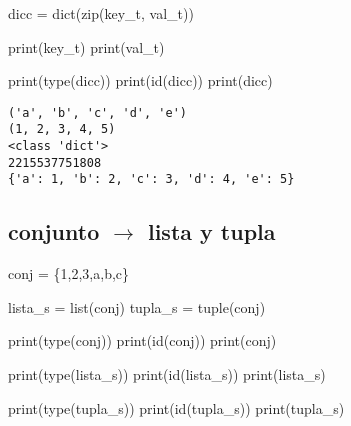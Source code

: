 \documentclass[
  letterpaper,
  DIV=11,
  numbers=noendperiod]{scrreprt}
\newenvironment{Shaded}{\begin{snugshade}}{\end{snugshade}}
\newcommand{\BuiltInTok}[1]{\textcolor[rgb]{0.00,0.23,0.31}{#1}}
\newcommand{\DecValTok}[1]{\textcolor[rgb]{0.68,0.00,0.00}{#1}}
\newcommand{\NormalTok}[1]{\textcolor[rgb]{0.00,0.23,0.31}{#1}}
\newcommand{\OperatorTok}[1]{\textcolor[rgb]{0.37,0.37,0.37}{#1}}
\newcommand{\StringTok}[1]{\textcolor[rgb]{0.13,0.47,0.30}{#1}}
\begin{document}
\begin{Shaded}
\begin{Highlighting}[]
\NormalTok{dicc }\OperatorTok{=} \BuiltInTok{dict}\NormalTok{(}\BuiltInTok{zip}\NormalTok{(key\_t, val\_t))}

\BuiltInTok{print}\NormalTok{(key\_t)}
\BuiltInTok{print}\NormalTok{(val\_t)}

\BuiltInTok{print}\NormalTok{(}\BuiltInTok{type}\NormalTok{(dicc))}
\BuiltInTok{print}\NormalTok{(}\BuiltInTok{id}\NormalTok{(dicc))}
\BuiltInTok{print}\NormalTok{(dicc)}
\end{Highlighting}
\end{Shaded}

\begin{verbatim}
('a', 'b', 'c', 'd', 'e')
(1, 2, 3, 4, 5)
<class 'dict'>
2215537751808
{'a': 1, 'b': 2, 'c': 3, 'd': 4, 'e': 5}
\end{verbatim}

\subsection{\texorpdfstring{conjunto \(\to\) lista y
tupla}{conjunto \textbackslash to lista y tupla}}\label{conjunto-to-lista-y-tupla}

\begin{Shaded}
\begin{Highlighting}[]
\NormalTok{conj }\OperatorTok{=}\NormalTok{ \{}\DecValTok{1}\NormalTok{,}\DecValTok{2}\NormalTok{,}\DecValTok{3}\NormalTok{,}\StringTok{\textquotesingle{}a\textquotesingle{}}\NormalTok{,}\StringTok{\textquotesingle{}b\textquotesingle{}}\NormalTok{,}\StringTok{\textquotesingle{}c\textquotesingle{}}\NormalTok{\}}
\end{Highlighting}
\end{Shaded}

\begin{Shaded}
\begin{Highlighting}[]
\NormalTok{lista\_s }\OperatorTok{=} \BuiltInTok{list}\NormalTok{(conj)}
\NormalTok{tupla\_s }\OperatorTok{=} \BuiltInTok{tuple}\NormalTok{(conj)}
\end{Highlighting}
\end{Shaded}

\begin{Shaded}
\begin{Highlighting}[]
\BuiltInTok{print}\NormalTok{(}\BuiltInTok{type}\NormalTok{(conj))}
\BuiltInTok{print}\NormalTok{(}\BuiltInTok{id}\NormalTok{(conj))}
\BuiltInTok{print}\NormalTok{(conj)}

\BuiltInTok{print}\NormalTok{(}\BuiltInTok{type}\NormalTok{(lista\_s))}
\BuiltInTok{print}\NormalTok{(}\BuiltInTok{id}\NormalTok{(lista\_s))}
\BuiltInTok{print}\NormalTok{(lista\_s)}

\BuiltInTok{print}\NormalTok{(}\BuiltInTok{type}\NormalTok{(tupla\_s))}
\BuiltInTok{print}\NormalTok{(}\BuiltInTok{id}\NormalTok{(tupla\_s))}
\BuiltInTok{print}\NormalTok{(tupla\_s)}
\end{Highlighting}
\end{Shaded}
\end{document}
